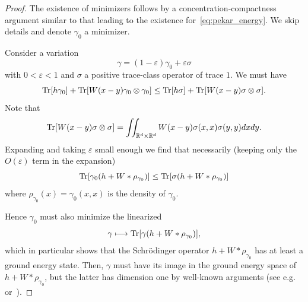 \documentclass[10pt]{amsart}
\theoremstyle{definition}\newtheorem{defi}[theo]{Definition}\newtheorem{rema}[theo]{Remark}\newtheorem{exam}[theo]{Example}\newtheorem{exem}[theo]{Example}\newtheorem{nota}[theo]{Notation}
\DeclareMathOperator{\Tr}{Tr}
\newcommand{\R}{\mathbb{R}}
\newcommand{\1}{\mathds{1}}
\newcommand{\eps}{\varepsilon}
\let\oldmapsto\mapsto
\renewcommand*{\mapsto}{\mathchoice{\longmapsto}{\oldmapsto}{\oldmapsto}{\oldmapsto}}
\let\originalleft\left
\let\originalright\right
\renewcommand{\left}{\mathopen{}\mathclose\bgroup\originalleft}
\renewcommand{\right}{\aftergroup\egroup\originalright}
\begin{document}
\begin{proof}
The existence of minimizers follows by a concentration-compactness argument similar to that leading to the existence for~\eqref{eq:pekar_energy}. We skip details and denote $\gamma_0$ a minimizer.

Consider a variation
\begin{equation*}
\gamma = (1- \eps)\gamma_0 + \eps \sigma
\end{equation*}
with $0<\eps <1$ and $\sigma$ a positive trace-class operator of trace $1$. We must have
\[
\Tr\left[h \gamma_0 \right] + \Tr \left[W(x-y) \gamma_0 \otimes \gamma_0 \right] \leq \Tr\left[h \sigma \right] + \Tr \left[W(x-y) \sigma \otimes \sigma \right].
\]
Note that
\[
\Tr \left[W(x-y) \sigma \otimes \sigma \right] = \iint_{\R^d \times \R^d} W(x-y) \sigma (x,x) \sigma (y,y)dxdy.
\]
Expanding and taking $\eps$ small enough we find that necessarily (keeping only the~$O(\eps)$ term in the expansion)
\begin{equation*}
\Tr\left[\gamma_0 \left(h + W\ast \rho_{\gamma_0}\right) \right] \leq \Tr\left[\sigma \left(h + W\ast \rho_{\gamma_0}\right) \right]
\end{equation*}
where $\rho_{\gamma_0} (x) = \gamma_0 (x,x)$ is the density of $\gamma_0$.

Hence $\gamma_0$ must also minimize the linearized
\begin{equation*}
\gamma \mapsto \Tr\left[\gamma \left(h + W\ast \rho_{\gamma_0}\right) \right],
\end{equation*}
which in particular shows that the Schr\"odinger operator $h + W\ast \rho_{\gamma_0}$ has at least a ground energy state. Then, $\gamma$ must have its image in the ground energy space of $h + W\ast \rho_{\gamma_0}$, but the latter has dimension one by well-known arguments (see e.g.~\cite[Theorem~2.3]{Rougerie-EMS} or~\cite[Section~XIII.12]{ReeSim4}).
\end{proof}
\end{document}
